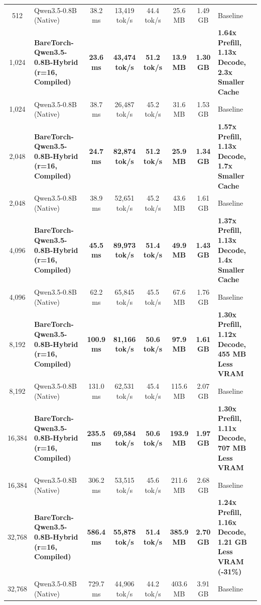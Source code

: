 \documentclass[twocolumn,10pt]{article}
\begin{document}
\begin{table}[!htbp]
{\begin{tabular}{clcccccl}
512 & Qwen3.5-0.8B (Native) & 38.2 ms & 13,419 tok/s & 44.4 tok/s & 25.6 MB & 1.49 GB & Baseline \\
1,024 & \textbf{BareTorch-Qwen3.5-0.8B-Hybrid (r=16, Compiled)} & \textbf{23.6 ms} & \textbf{43,474 tok/s} & \textbf{51.2 tok/s} & \textbf{13.9 MB} & \textbf{1.30 GB} & \textbf{1.64x Prefill, 1.13x Decode, 2.3x Smaller Cache} \\
1,024 & Qwen3.5-0.8B (Native) & 38.7 ms & 26,487 tok/s & 45.2 tok/s & 31.6 MB & 1.53 GB & Baseline \\
2,048 & \textbf{BareTorch-Qwen3.5-0.8B-Hybrid (r=16, Compiled)} & \textbf{24.7 ms} & \textbf{82,874 tok/s} & \textbf{51.2 tok/s} & \textbf{25.9 MB} & \textbf{1.34 GB} & \textbf{1.57x Prefill, 1.13x Decode, 1.7x Smaller Cache} \\
2,048 & Qwen3.5-0.8B (Native) & 38.9 ms & 52,651 tok/s & 45.2 tok/s & 43.6 MB & 1.61 GB & Baseline \\
4,096 & \textbf{BareTorch-Qwen3.5-0.8B-Hybrid (r=16, Compiled)} & \textbf{45.5 ms} & \textbf{89,973 tok/s} & \textbf{51.4 tok/s} & \textbf{49.9 MB} & \textbf{1.43 GB} & \textbf{1.37x Prefill, 1.13x Decode, 1.4x Smaller Cache} \\
4,096 & Qwen3.5-0.8B (Native) & 62.2 ms & 65,845 tok/s & 45.5 tok/s & 67.6 MB & 1.76 GB & Baseline \\
8,192 & \textbf{BareTorch-Qwen3.5-0.8B-Hybrid (r=16, Compiled)} & \textbf{100.9 ms} & \textbf{81,166 tok/s} & \textbf{50.6 tok/s} & \textbf{97.9 MB} & \textbf{1.61 GB} & \textbf{1.30x Prefill, 1.12x Decode, 455 MB Less VRAM} \\
8,192 & Qwen3.5-0.8B (Native) & 131.0 ms & 62,531 tok/s & 45.4 tok/s & 115.6 MB & 2.07 GB & Baseline \\
16,384 & \textbf{BareTorch-Qwen3.5-0.8B-Hybrid (r=16, Compiled)} & \textbf{235.5 ms} & \textbf{69,584 tok/s} & \textbf{50.6 tok/s} & \textbf{193.9 MB} & \textbf{1.97 GB} & \textbf{1.30x Prefill, 1.11x Decode, 707 MB Less VRAM} \\
16,384 & Qwen3.5-0.8B (Native) & 306.2 ms & 53,515 tok/s & 45.6 tok/s & 211.6 MB & 2.68 GB & Baseline \\
32,768 & \textbf{BareTorch-Qwen3.5-0.8B-Hybrid (r=16, Compiled)} & \textbf{586.4 ms} & \textbf{55,878 tok/s} & \textbf{51.4 tok/s} & \textbf{385.9 MB} & \textbf{2.70 GB} & \textbf{1.24x Prefill, 1.16x Decode, 1.21 GB Less VRAM (-31\%)} \\
32,768 & Qwen3.5-0.8B (Native) & 729.7 ms & 44,906 tok/s & 44.2 tok/s & 403.6 MB & 3.91 GB & Baseline \\
\bottomrule
\end{tabular}%
}
\end{table}
\end{document}
